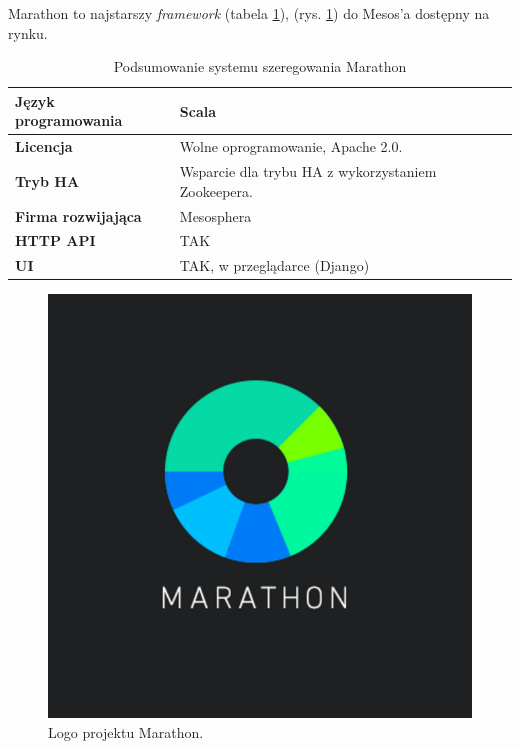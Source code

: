 \documentclass[10pt,a4paper,titlepage,twoside]{report}
\begin{document}
Marathon to najstarszy \textit{framework} (tabela \ref{marathon_info}), (rys. \ref{marathon_logo}) do Mesos'a dostępny na rynku. 
\begin{table}[!h]
\caption{Podsumowanie systemu szeregowania Marathon}
\label{marathon_info}
\centering
\begin{tabular}{|p{4cm}|p{6cm}|}
  \hline
  \textbf{Język programowania} & Scala \\
  \hline
  \textbf{Licencja} & Wolne oprogramowanie, Apache 2.0. \\
  \hline
  \textbf{Tryb HA} & Wsparcie dla trybu HA z wykorzystaniem Zookeepera. \\
  \hline
  \textbf{Firma rozwijająca} & Mesosphera \\
  \hline
  \textbf{HTTP API} & TAK \\
  \hline
  \textbf{UI} & TAK, w przeglądarce (Django) \\
  \hline
\end{tabular}
\end{table}

\begin{figure}[!h]
	\centering
	\includegraphics[scale=0.5]{pics/marathon_logo.png}
	\caption{Logo projektu Marathon.}
	\label{marathon_logo}
\end{figure}
\end{document}
